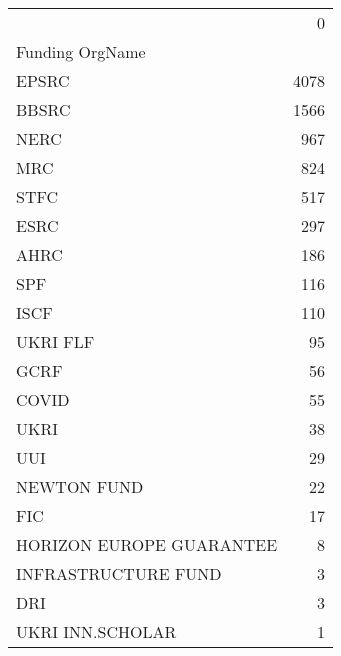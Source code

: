 \begin{tabular}{lr}
\toprule
 & 0 \\
Funding OrgName &  \\
\midrule
EPSRC & 4078 \\
BBSRC & 1566 \\
NERC & 967 \\
MRC & 824 \\
STFC & 517 \\
ESRC & 297 \\
AHRC & 186 \\
SPF & 116 \\
ISCF & 110 \\
UKRI FLF & 95 \\
GCRF & 56 \\
COVID & 55 \\
UKRI & 38 \\
UUI & 29 \\
NEWTON FUND & 22 \\
FIC & 17 \\
HORIZON EUROPE GUARANTEE & 8 \\
INFRASTRUCTURE FUND & 3 \\
DRI & 3 \\
UKRI INN.SCHOLAR & 1 \\
\bottomrule
\end{tabular}
